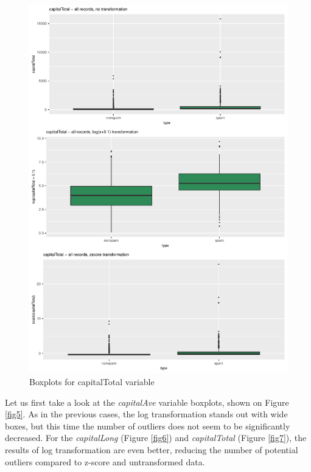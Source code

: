 \documentclass{article}\usepackage[]{graphicx}\usepackage[]{xcolor}
\makeatletter
\def\maxwidth{ %
  \ifdim\Gin@nat@width>\linewidth
    \linewidth
  \else
    \Gin@nat@width
  \fi
}
\newenvironment{knitrout}{}{} %
\makeatother
\begin{document}
\begin{knitrout}
\color{fgcolor}\begin{figure}[h]
\includegraphics[width=\maxwidth]{figure/capitalTotalBox-1} \caption[\label{fig7} Boxplots for capitalTotal variable]{\label{fig7} Boxplots for capitalTotal variable}\label{fig:capitalTotalBox}
\end{figure}

\end{knitrout}

Let us first take a look at the \textit{capitalAve} variable boxplots, shown on Figure \ref{fig5}.
As in the previous cases, the log transformation stands out with wide boxes, but this time the number 
of outliers does not seem to be significantly decreased. For the \textit{capitalLong}
(Figure \ref{fig6}) and \textit{capitalTotal} (Figure \ref{fig7}), the results of 
log transformation are even better, reducing the number of potential outliers compared
to z-score and untransformed data.
\end{document}
